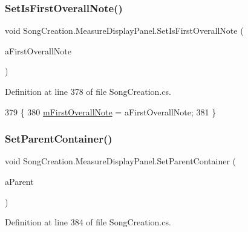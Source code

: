 \subsubsection{\texorpdfstring{Set\+Is\+First\+Overall\+Note()}{SetIsFirstOverallNote()}}
{\footnotesize\ttfamily void Song\+Creation.\+Measure\+Display\+Panel.\+Set\+Is\+First\+Overall\+Note (\begin{DoxyParamCaption}\item[{bool}]{a\+First\+Overall\+Note }\end{DoxyParamCaption})}



Definition at line 378 of file Song\+Creation.\+cs.


\begin{DoxyCode}
379         \{
380             \hyperlink{class_song_creation_1_1_measure_display_panel_a3794bf2a605eaa0595e6c6e41f5b458c}{mFirstOverallNote} = aFirstOverallNote;
381         \}
\end{DoxyCode}
\mbox{\label{class_song_creation_1_1_measure_display_panel_a6ac294ddd95114544f6fcc6e3c9ab355}} 
\subsubsection{\texorpdfstring{Set\+Parent\+Container()}{SetParentContainer()}}
{\footnotesize\ttfamily void Song\+Creation.\+Measure\+Display\+Panel.\+Set\+Parent\+Container (\begin{DoxyParamCaption}\item[{\hyperlink{class_song_creation_1_1_note_display_container}{Note\+Display\+Container}}]{a\+Parent }\end{DoxyParamCaption})}



Definition at line 384 of file Song\+Creation.\+cs.


